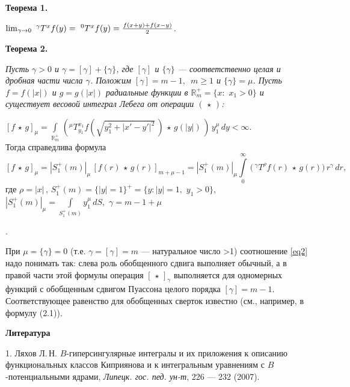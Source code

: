 	{\bf Теорема 1.}  {\it $\lim_{\gamma\to0}\,\,^\gamma T^x f(y)=\,\,^0T^x f(y)={f(x+y)+f(x-y)\over2}$.

{\bf Теорема 2.}  {\it    Пусть $\gamma{>}0$ и $\gamma=[\gamma]+\{\gamma\}$, где $[\gamma]$ и $\{\gamma\}$ --- соответственно целая и дробная части числа $\gamma$.
Положим $[\gamma]=m-1, \,\,\,m\geqslant1$ и $\{\gamma\}=\mu$. Пусть $f=f(|x|)$ и
$g=g(|x|)$ радиальные функции в $\mathbb{R}^+_m=\{x:\,\,x_1>0\}$ и существует весовой интеграл Лебега от операции $(\,\star\,)$:

$
[f\,\star\,g]_\mu=\int\limits_{\mathbb{R}^+_m}\,\left(^\mu T^{x_1}_{y_1}f(\sqrt{y_1^2+
|x'-y'|^2}\,)\,\star\,g(|y|)\,\right)\,y_1^\mu\,dy<\infty.
$ \\
Тогда справедлива формула
\begin{equation}\label{eq2}
[f\,\star\,g]_\mu=|S_1^+(m)|_\mu\, \left[f(r)\,\star\,g(r)\right]_{m+\mu-1} =
|S^+_1(m)|_\mu\int\limits_0^\infty \,\biggl(\,^\gamma T^\rho f(r)\,\star\,g(r)
\biggl)\,r^\gamma\,dr,
\end{equation}
где  $\rho=|x|\,, \,S^+_1(m){=}\{|y|{=}1\}^+{=}\{y:|y|{=}1,\,\,y_1>0\}$,
$
|S_1^+(m)|_\mu{=}\int\limits_{S_1^+(m)} y_1^\mu\,dS,$  $\gamma{=}m{-}1{+}\mu$}}.

 При $\mu=\{\gamma\}=0$ (т.е. $\gamma=[\gamma]=m$ --- натуральное число >1) соотношение \eqref{eq2} надо понимать так:
 слева роль обобщенного сдвига выполняет обычный, а в правой части этой формулы операция $[\,\star\,]_\gamma$ выполняется для одномерных функций с обобщенным сдвигом Пуассона целого порядка $[\gamma]=m-1$. Соответствующее равенство для обобщенных сверток известно   (см., например,  в \cite{lit-ra3} формулу (2.1)).

\smallskip \centerline{\bf Литература}\nopagebreak

1. Ляхов Л.\,Н. $B$-гиперсингулярные интегралы и их приложения к описанию функциональных классов Киприянова и к интегральным уравнениям с $B$-потенциальными ядрами,  {\it Липецк. гос. пед. ун-т}, 226 --- 232 (2007).

